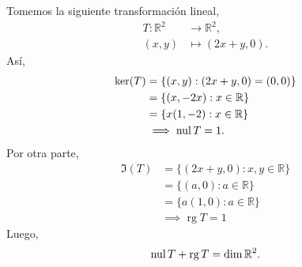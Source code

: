 \documentclass[12pt,a4paper]{book}
\DeclareMathOperator{\rg}{rg}
\newcommand{\llaves}[1]{\{#1\}}
\begin{document}
    \begin{ejemplo}
        Tomemos la siguiente transformación lineal,
        \begin{align*}
            T : \mathbb{R}^2 & \to \mathbb{R}^2,\\
            (x,y) & \mapsto (2x + y, 0).
        \end{align*}
        Así,
        \begin{align*}
            \ker(T) & = \llaves{(x,y):(2x + y, 0) = (0, 0)}\\
            & = \llaves{(x, -2x):x \in \mathbb{R}}\\
            & = \llaves{x(1,-2):x \in \mathbb{R}}\\
            & \implies \nul{T} = 1.
        \end{align*}
        Por otra parte, 
        \begin{align*}
            \Im(T) & = \llaves{(2x + y, 0): x, y \in \mathbb{R}}\\
            & = \llaves{(a, 0): a \in \mathbb{R}}\\
            & = \llaves{a(1,0): a \in \mathbb{R}}\\
            & \implies \rg{T} = 1
        \end{align*}
        Luego,
        \begin{equation*}
            \nul{T} + \rg{T} = \dim \mathbb{R}^2.
        \end{equation*}
    \end{ejemplo}
\end{document}

